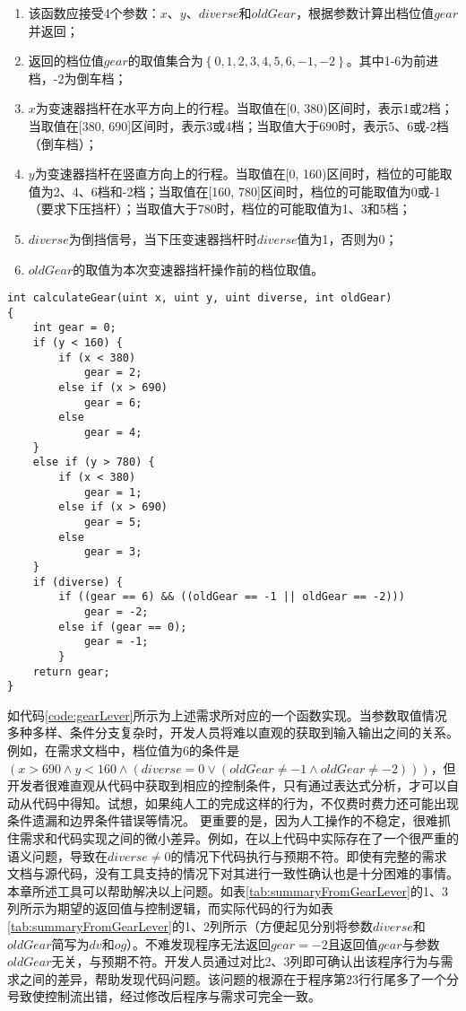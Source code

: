 \begin{enumerate}
	\item 该函数应接受4个参数：$ x $、$ y $、$ diverse $和$ oldGear $，根据参数计算出档位值$ gear $并返回；
	\item 返回的档位值$ gear $的取值集合为$\left\{0, 1, 2, 3, 4, 5, 6, -1, -2\right\}$。其中1-6为前进档，-2为倒车档；
	\item $ x $为变速器挡杆在水平方向上的行程。当取值在[0, 380)区间时，表示1或2档；当取值在[380, 690]区间时，表示3或4档；当取值大于690时，表示5、6或-2档（倒车档）；
	\item  $ y $为变速器挡杆在竖直方向上的行程。当取值在[0, 160)区间时，档位的可能取值为2、4、6档和-2档；当取值在[160, 780]区间时，档位的可能取值为0或-1（要求下压挡杆）；当取值大于780时，档位的可能取值为1、3和5档；
	\item $ diverse $为倒挡信号，当下压变速器挡杆时$ diverse $值为1，否则为0；
	\item $ oldGear $的取值为本次变速器挡杆操作前的档位取值。
\end{enumerate}

\begin{lstlisting}[label=code:gearLever,caption=变速器档位控制的一个函数实现]
int calculateGear(uint x, uint y, uint diverse, int oldGear)
{
	int gear = 0;
	if (y < 160) {
		if (x < 380)
			gear = 2;
		else if (x > 690)
			gear = 6;
		else
			gear = 4;
	}
	else if (y > 780) {
		if (x < 380)
			gear = 1;
		else if (x > 690)
			gear = 5;
		else
			gear = 3;
	}
	if (diverse) {
		if ((gear == 6) && ((oldGear == -1 || oldGear == -2)))
			gear = -2;
		else if (gear == 0);
			gear = -1;
		}
	return gear;
}
\end{lstlisting}

如代码\ref{code:gearLever}所示为上述需求所对应的一个函数实现。当参数取值情况多种多样、条件分支复杂时，开发人员将难以直观的获取到输入输出之间的关系。例如，在需求文档中，档位值为6的条件是$  (x > 690 ∧ y < 160 ∧ (diverse = 0 ∨ (oldGear ≠ -1 ∧ oldGear ≠ -2))) $，但开发者很难直观从代码中获取到相应的控制条件，只有通过表达式分析，才可以自动从代码中得知。试想，如果纯人工的完成这样的行为，不仅费时费力还可能出现条件遗漏和边界条件错误等情况。
更重要的是，因为人工操作的不稳定，很难抓住需求和代码实现之间的微小差异。例如，在以上代码中实际存在了一个很严重的语义问题，导致在$ diverse ≠ 0 $的情况下代码执行与预期不符。即使有完整的需求文档与源代码，没有工具支持的情况下对其进行一致性确认也是十分困难的事情。
本章所述工具可以帮助解决以上问题。如表\ref{tab:summaryFromGearLever}的1、3列所示为期望的返回值与控制逻辑，而实际代码的行为如表\ref{tab:summaryFromGearLever}的1、2列所示（方便起见分别将参数$ diverse $和$ oldGear $简写为$ dv $和$ og $）。不难发现程序无法返回$ gear = -2 $且返回值$ gear $与参数$ oldGear $无关，与预期不符。开发人员通过对比2、3列即可确认出该程序行为与需求之间的差异，帮助发现代码问题。该问题的根源在于程序第23行行尾多了一个分号致使控制流出错，经过修改后程序与需求可完全一致。

